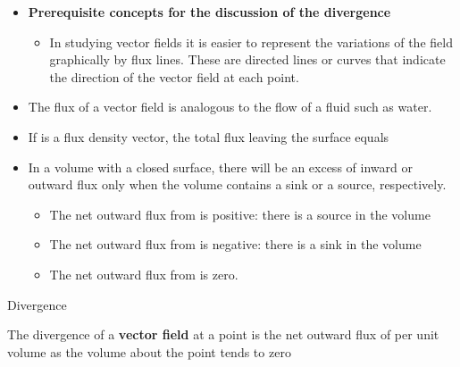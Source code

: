 \begin{ELunit}

\begin{itemize}
\tightlist
\item
  \textbf{Prerequisite concepts for the discussion of the divergence}

  \begin{itemize}
  \tightlist
  \item
    In studying vector fields it is easier to represent the variations of the field graphically by flux lines. These are directed lines or curves that indicate the direction of the vector field at each point.
  \end{itemize}
\end{itemize}


\begin{itemize}
\tightlist
\item
  The flux of a vector field is analogous to the flow of a fluid such as water.
\item
  If  is a flux density vector, the total flux leaving the surface  equals
\end{itemize}


\begin{itemize}
\tightlist
\item
  In a volume with a closed surface, there will be an excess of inward or outward flux only when the volume contains a sink or a source, respectively.

  \begin{itemize}
  \tightlist
  \item
    The net outward flux from  is positive: there is a source in the volume 
  \item
    The net outward flux from  is negative: there is a sink in the volume 
  \item
    The net outward flux from  is zero.
  \end{itemize}
\end{itemize}


\end{ELunit}

\begin{ELdefinition}{Divergence}

The divergence of a \textbf{vector field}  at a point is the net outward flux of  per unit volume as the volume about the point tends to zero


\end{ELdefinition}

